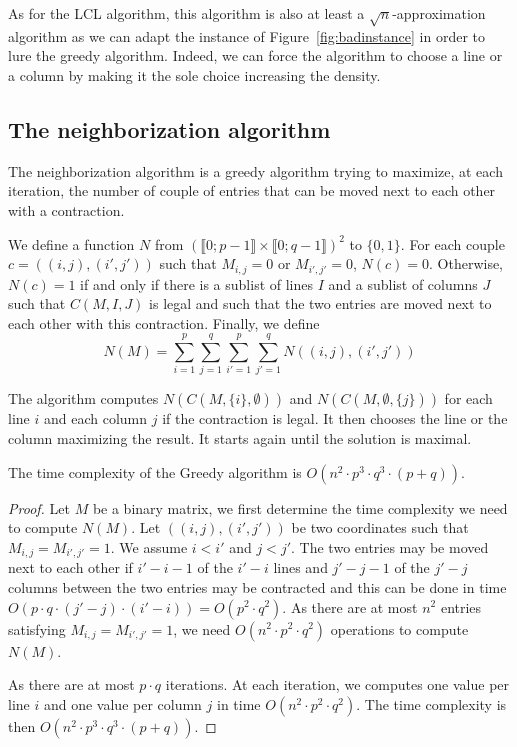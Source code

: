 \begin{remark}
	As for the LCL algorithm, this algorithm is also at least a $\sqrt{n}$-approximation algorithm as we can adapt the instance of Figure~\ref{fig:badinstance} in order to lure the greedy algorithm. Indeed, we can force the algorithm to choose a line or a column by making it the sole choice increasing the density.
\end{remark}

\subsection{The neighborization algorithm}

The neighborization algorithm is a greedy algorithm trying to maximize, at each iteration, the number of couple of entries that can be moved next to each other with a contraction.

We define a function $N$ from $(\llbracket 0;p-1 \rrbracket \times \llbracket 0;q-1 \rrbracket)^2$ to $\{0,1\}$.
For each couple $c = ((i,j),(i',j'))$ such that $M_{i,j} = 0$ or $M_{i',j'} = 0$, $N(c) = 0$. Otherwise, $N(c) = 1$ if and only if there is a sublist of lines $I$ and a sublist of columns $J$ such that $C(M,I,J)$ is legal and such that the two entries are moved next to each other with this contraction. Finally, we define $$N(M) = \sum\limits_{i = 1}^p\sum\limits_{j = 1}^q\sum\limits_{i' = 1}^p\sum\limits_{j' = 1}^q N((i,j),(i',j'))$$

The algorithm computes $N(C(M,\{i\},\emptyset))$ and $N(C(M,\emptyset, \{j\}))$ for each line $i$ and each column $j$ if the contraction is legal. It then chooses the line or the column maximizing the result. It starts again until the solution is maximal.

\begin{theorem}
	The time complexity of the Greedy algorithm is $O(n^2 \cdot p^3 \cdot q^3 \cdot (p+q))$. 
\end{theorem}
\begin{proof}
	Let $M$ be a binary matrix, we first determine the time complexity we need to compute $N(M)$. Let $((i,j),(i',j'))$ be two coordinates such that $M_{i,j} = M_{i',j'} = 1$. We assume $i < i'$ and $j < j'$. The two entries may be moved next to each other if $i'- i -1$ of the $i'-i$ lines and $j'- j -1$ of the $j'-j$ columns between the two entries may be contracted and this can be done in time $O(p \cdot q \cdot (j'-j) \cdot (i'-i)) = O(p^2 \cdot q^2)$. As there are at most $n^2$ entries satisfying $M_{i,j} = M_{i',j'} = 1$, we need $O(n^2 \cdot p^2 \cdot q^2)$ operations to compute $N(M)$.  
	
	As there are at most $p \cdot q$ iterations. At each iteration, we computes one value per line $i$ and one value per column $j$ in time $O(n^2 \cdot p^2 \cdot q^2)$. The time complexity is then $O(n^2 \cdot p^3 \cdot q^3 \cdot (p+q))$.
\end{proof}

